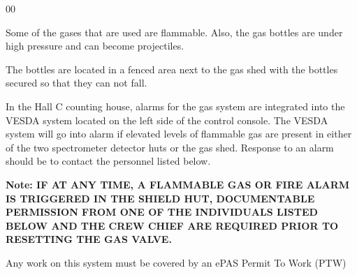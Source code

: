 \begin{safetyen}{0}{0}
\label{sec:hallc-det-gasalarms}


Some of the gases that are used are flammable.  Also, the gas bottles
are under high pressure and can become projectiles.


The bottles are located in a fenced area next to the gas shed with the bottles
secured so that they can not fall.

In the Hall C counting house, alarms for the gas system
are integrated into the VESDA system located on the left side
of the control console.  The VESDA system will go into
alarm if elevated levels of flammable gas are present in
either of the two spectrometer detector huts or the gas shed.
Response to an alarm should be to contact the personnel listed below.

\textbf{Note: IF AT ANY TIME, A FLAMMABLE GAS OR FIRE ALARM IS TRIGGERED IN THE SHIELD HUT, DOCUMENTABLE PERMISSION FROM ONE OF THE INDIVIDUALS LISTED BELOW AND THE CREW CHIEF ARE REQUIRED PRIOR TO RESETTING THE GAS VALVE.}

Any work on this system must be covered by an ePAS Permit To Work (PTW)



\end{safetyen}

